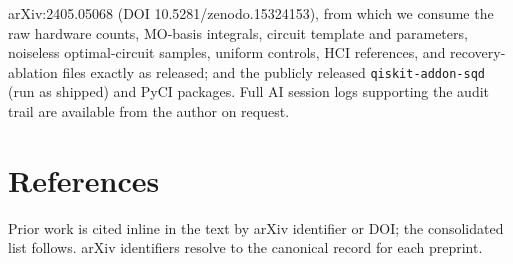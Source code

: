 \documentclass[11pt]{article}
\begin{document}
\begin{sloppypar}
arXiv:2405.05068 (DOI 10.5281/zenodo.15324153), from which we consume the raw hardware counts, MO-basis integrals, circuit template and parameters, noiseless optimal-circuit samples, uniform controls, HCI references, and recovery-ablation files exactly as released; and the publicly released \texttt{qiskit-addon-sqd} (run as shipped) and PyCI packages. Full AI session logs supporting the audit trail are available from the author on request.
\end{sloppypar}


\section*{References}

Prior work is cited inline in the text by arXiv identifier or DOI; the consolidated list follows. arXiv identifiers resolve to the canonical record for each preprint.
\end{document}
